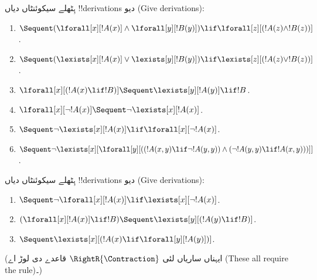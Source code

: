 \documentclass[../../../include/open-logic-section]{subfiles}
\begin{document}
\begin{prob}
ہِٹھلے سیکوئنٹاں دیاں !!{derivation}s دیو (Give derivations):
\begin{enumerate}
\item $\Sequent (\lforall[x][!A(x)] \land \lforall[y][!B(y)]) \lif
\lforall[z][(!A(z) \land !B(z))]$.
\item $\Sequent (\lexists[x][!A(x)] \lor \lexists[y][!B(y)]) \lif
\lexists[z][(!A(z) \lor !B(z))]$.
\item $\lforall[x][(!A(x) \lif !B)] \Sequent \lexists[y][!A(y)] \lif !B$.
\item $\lforall[x][\lnot !A(x)] \Sequent \lnot\lexists[x][!A(x)]$.
\item $\Sequent \lnot\lexists[x][!A(x)] \lif \lforall[x][\lnot !A(x)]$.
\item $\Sequent \lnot\lexists[x][\lforall[y][((!A(x,y) \lif \lnot
!A(y,y)) \land (\lnot !A(y,y) \lif !A(x,y)))]]$.
\end{enumerate}
\end{prob}

\begin{prob}
ہِٹھلے سیکوئنٹاں دیاں !!{derivation}s دیو (Give derivations):
\begin{enumerate}
\item $\Sequent \lnot\lforall[x][!A(x)] \lif \lexists[x][\lnot!A(x)]$.
\item $(\lforall[x][!A(x)] \lif !B) \Sequent \lexists[y][(!A(y) \lif !B)]$.
\item $\Sequent \lexists[x][(!A(x) \lif \lforall[y][!A(y)])]$.
\end{enumerate}
(ایہناں ساریاں لئی $\RightR{\Contraction}$ قاعدے دی لوڑ اے (These all require the rule)۔)
\end{prob}
\end{document}
